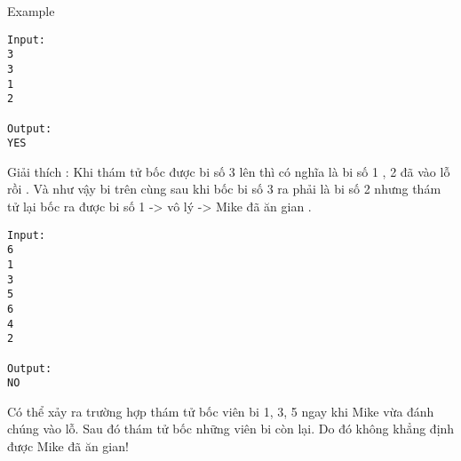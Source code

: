 Example
\begin{verbatim}
Input:
3
3
1
2

Output:
YES
\end{verbatim}

   Giải thích : Khi thám tử bốc được bi số 3 lên thì có nghĩa là bi số 1 , 2 đã vào lỗ rồi . Và như vậy bi trên cùng sau khi bốc bi số 3 ra phải là bi số 2 nhưng thám tử lại bốc ra được bi số 1 -> vô lý -> Mike đã ăn gian .  
\begin{verbatim}
Input:
6
1
3
5
6
4
2

Output:
NO
\end{verbatim}

   Có thể xảy ra trường hợp thám tử bốc viên bi 1, 3, 5 ngay khi Mike vừa đánh chúng vào lỗ. Sau đó thám tử bốc những viên bi còn lại. Do đó không khẳng định được Mike đã ăn gian!